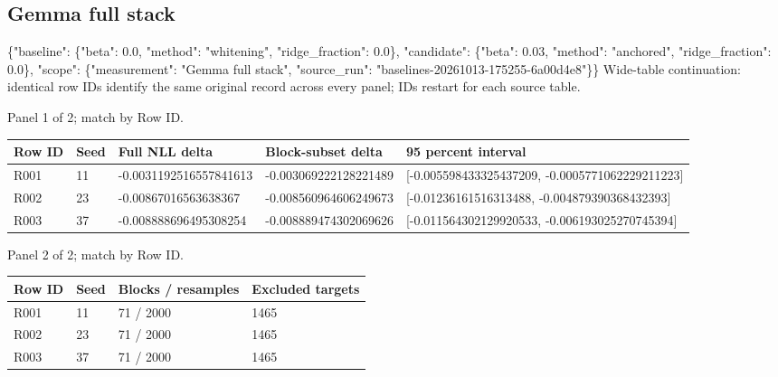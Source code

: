 \documentclass[10pt]{article}
\begin{document}
\subsection{Gemma full stack}
\{"baseline": \{"beta": 0.0, "method": "whitening", "ridge\_fraction": 0.0\}, "candidate": \{"beta": 0.03, "method": "anchored", "ridge\_fraction": 0.0\}, "scope": \{"measurement": "Gemma full stack", "source\_run": "baselines-20261013-175255-6a00d4e8"\}\}
Wide-table continuation: identical row IDs identify the same original record across every panel; IDs restart for each source table.
\par\noindent Panel 1 of 2; match by Row ID.
{\scriptsize\setlength{\tabcolsep}{2pt}
\begin{longtable}{p{}p{}p{}p{}p{}}
Row ID & Seed & Full NLL delta & Block-subset delta & 95 percent interval \\
\hline\endhead
R001 & 11 & -0.0031192516557841613 & -0.003069222128221489 & [-0.005598433325437209, -0.0005771062229211223] \\
R002 & 23 & -0.00867016563638367 & -0.008560964606249673 & [-0.01236161516313488, -0.004879390368432393] \\
R003 & 37 & -0.008888696495308254 & -0.008889474302069626 & [-0.011564302129920533, -0.006193025270745394] \\
\end{longtable}}
\par\noindent Panel 2 of 2; match by Row ID.
{\scriptsize\setlength{\tabcolsep}{2pt}
\begin{longtable}{p{}p{}p{}p{}}
Row ID & Seed & Blocks / resamples & Excluded targets \\
\hline\endhead
R001 & 11 & 71 / 2000 & 1465 \\
R002 & 23 & 71 / 2000 & 1465 \\
R003 & 37 & 71 / 2000 & 1465 \\
\end{longtable}}
\end{document}
